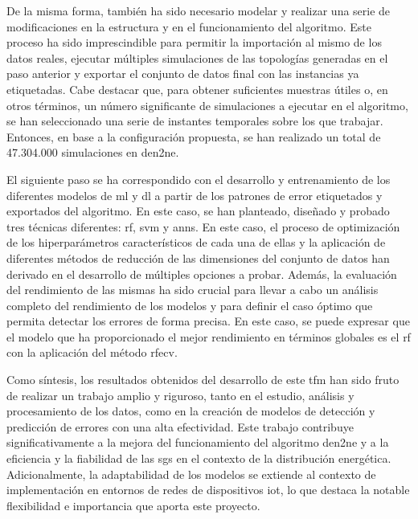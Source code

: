 De la misma forma, también ha sido necesario modelar y realizar una serie de modificaciones en la estructura y en el funcionamiento del algoritmo. Este proceso ha sido imprescindible para permitir la importación al mismo de los datos reales, ejecutar múltiples simulaciones de las topologías generadas en el paso anterior y exportar el conjunto de datos final con las instancias ya etiquetadas. Cabe destacar que, para obtener suficientes muestras útiles o, en otros términos, un número significante de simulaciones a ejecutar en el algoritmo, se han seleccionado una serie de instantes temporales sobre los que trabajar. Entonces, en base a la configuración propuesta, se han realizado un total de 47.304.000 simulaciones en \gls{den2ne}.

\vspace{3mm}

El siguiente paso se ha correspondido con el desarrollo y entrenamiento de los diferentes modelos de \gls{ml} y \gls{dl} a partir de los patrones de error etiquetados y exportados del algoritmo. En este caso, se han planteado, diseñado y probado tres técnicas diferentes: \gls{rf}, \gls{svm} y \gls{ann}s. En este caso, el proceso de optimización de los hiperparámetros característicos de cada una de ellas y la aplicación de diferentes métodos de reducción de las dimensiones del conjunto de datos han derivado en el desarrollo de múltiples opciones a probar. Además, la evaluación del rendimiento de las mismas ha sido crucial para llevar a cabo un análisis completo del rendimiento de los modelos y para definir el caso óptimo que permita detectar los errores de forma precisa. En este caso, se puede expresar que el modelo que ha proporcionado el mejor rendimiento en términos globales es el \gls{rf} con la aplicación del método \gls{rfecv}.

\vspace{3mm}

Como síntesis, los resultados obtenidos del desarrollo de este \gls{tfm} han sido fruto de realizar un trabajo amplio y riguroso, tanto en el estudio, análisis y procesamiento de los datos, como en la creación de modelos de detección y predicción de errores con una alta efectividad. Este trabajo contribuye significativamente a la mejora del funcionamiento del algoritmo \gls{den2ne} y a la eficiencia y la fiabilidad de las \gls{sg}s en el contexto de la distribución energética. Adicionalmente, la adaptabilidad de los modelos se extiende al contexto de implementación en entornos de redes de dispositivos \gls{iot}, lo que destaca la notable flexibilidad e importancia que aporta este proyecto.

